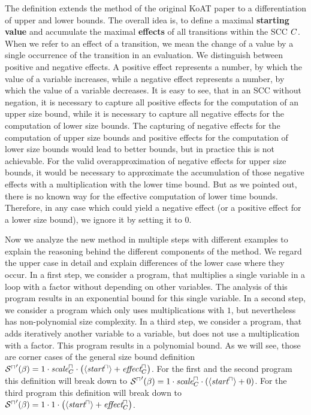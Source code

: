 The definition extends the method of the original KoAT paper \cite{koat} to a differentiation of upper and lower bounds.
The overall idea is, to define a maximal \textbf{starting value} and accumulate the maximal \textbf{effects} of all transitions within the SCC $C$.
When we refer to an effect of a transition, we mean the change of a value by a single occurrence of the transition in an evaluation.
We distinguish between positive and negative effects.
A positive effect represents a number, by which the value of a variable increases, while a negative effect represents a number, by which the value of a variable decreases.
It is easy to see, that in an SCC without negation, it is necessary to capture all positive effects for the computation of an upper size bound, while it is necessary to capture all negative effects for the computation of lower size bounds.
The capturing of negative effects for the computation of upper size bounds and positive effects for the computation of lower size bounds would lead to better bounds, but in practice this is not achievable.
For the valid overapproximation of negative effects for upper size bounds, it would be necessary to approximate the accumulation of those negative effects with a multiplication with the lower time bound.
But as we pointed out, there is no known way for the effective computation of lower time bounds.
Therefore, in any case which could yield a negative effect (or a positive effect for a lower size bound), we ignore it by setting it to $0$.

Now we analyze the new method in multiple steps with different examples to explain the reasoning behind the different components of the method.
We regard the upper case in detail and explain differences of the lower case where they occur.
In a first step, we consider a program, that multiplies a single variable in a loop with a factor without depending on other variables.
The analysis of this program results in an exponential bound for this single variable.
In a second step, we consider a program which only uses multiplications with $1$, but nevertheless has non-polynomial size complexity.
In a third step, we consider a program, that adds iteratively another variable to a variable, but does not use a multiplication with a factor.
This program results in a polynomial bound.
As we will see, those are corner cases of the general size bound definition ${\mathcal{S}^\sqcap}'(\beta) = 1 \cdot \emph{scale}^\sqcap_C \cdot \left( \langle\emph{start}^\sqcap\rangle + \emph{effect}^\sqcap_C \right)$.
For the first and the second program this definition will break down to ${\mathcal{S}^\sqcap}'(\beta) = 1 \cdot \emph{scale}^\sqcap_C \cdot \left( \langle\emph{start}^\sqcap\rangle + 0 \right)$.
For the third program this definition will break down to ${\mathcal{S}^\sqcap}'(\beta) = 1 \cdot 1 \cdot \left( \langle\emph{start}^\sqcap\rangle + \emph{effect}^\sqcap_C \right)$.

